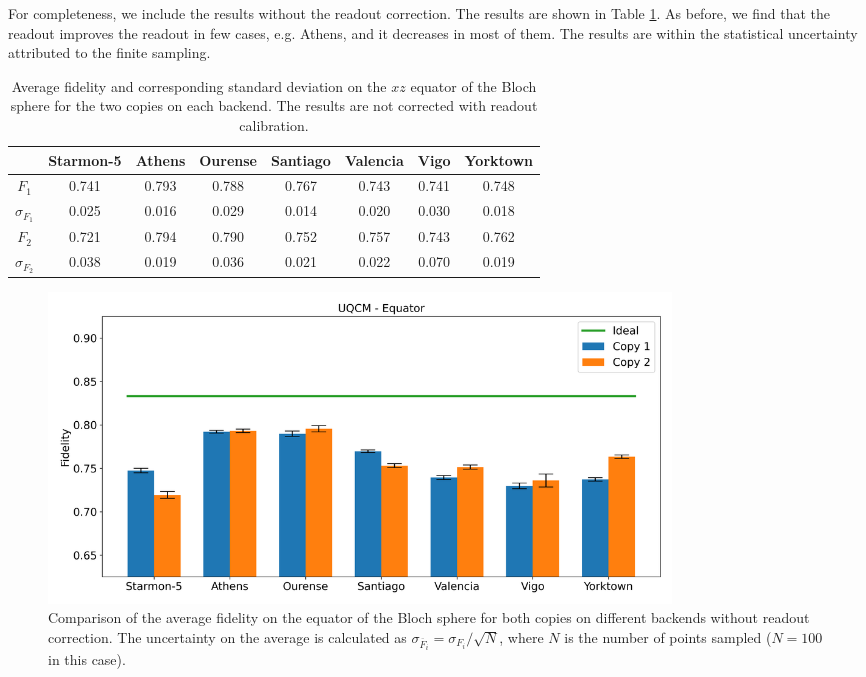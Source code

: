For completeness, we include the results without the readout correction. The results are shown in Table \ref{tab:uqcm_results_eq_non}. As before, we find that the readout improves the readout in few cases, e.g. Athens, and it decreases in most of them. The results are within the statistical uncertainty attributed to the finite sampling.

\begin{table}[H]
    \centering
    \begin{tabular}{|c|c|c|c|c|c|c|c|}
    \hline
    \textbf{} & \textbf{Starmon-5} & \textbf{Athens} & \textbf{Ourense} & \textbf{Santiago} & \textbf{Valencia} & \textbf{Vigo} & \textbf{Yorktown} \\ \hline
    $F_1$              & 0.741 & 0.793 & 0.788 & 0.767 & 0.743 & 0.741 & 0.748\\ \hline
    $\sigma_{F_1}$     & 0.025 & 0.016 & 0.029 & 0.014 & 0.020 & 0.030 & 0.018 \\ \hline
    $F_2$              & 0.721 & 0.794 & 0.790 & 0.752 & 0.757 & 0.743 & 0.762 \\ \hline
    $\sigma_{F_2}$     & 0.038 & 0.019 & 0.036 & 0.021 & 0.022 & 0.070 & 0.019 \\ \hline
    \end{tabular}
    \caption{Average fidelity and corresponding standard deviation on the $xz$ equator of the Bloch sphere for the two copies on each backend. The results are not corrected with readout calibration.}\label{tab:uqcm_results_eq_non}
\end{table}

\begin{figure}[H]
    \centering
            \includegraphics[width=0.8\textwidth]{Figures/UQCM/Histograms/histo_equator_corrected.png}
        
        \caption{Comparison of the average fidelity on the equator of the Bloch sphere for both copies on different backends without readout correction. The uncertainty on the average is calculated as $\sigma_{\overline{F}_i}=\sigma_{F_i}/\sqrt{N}$, where $N$ is the number of points sampled ($N=100$ in this case).}\label{fig:hist_uqcm_sphere}
\end{figure}

